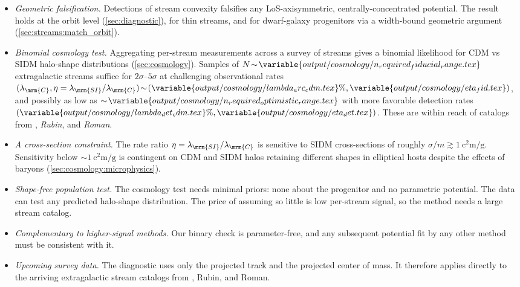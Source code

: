 \documentclass[linenumbers,twocolumn]{aastex701}
\newcommand{\lamC}{\ensuremath{\lambda_{\mrm{C}}}}    %
\newcommand{\lamSI}{\ensuremath{\lambda_{\mrm{SI}}}}  %
\newcommand{\lamCval}{\variable{output/cosmology/lambda_arc_cdm.tex}\%}
\begin{document}
    \begin{itemize}[leftmargin=5pt, labelsep=0.5em]
        \item \emph{Geometric falsification.} %
        Detections of stream convexity falsifies any \gls{LoS}-axisymmetric, centrally-concentrated potential. %
        The result holds at the orbit level (\autoref{sec:diagnostic}), for thin streams, and for dwarf-galaxy progenitors via a width-bound geometric argument (\autoref{sec:streams:match_orbit}).  %
        \item \emph{Binomial cosmology test.} %
        Aggregating per-stream measurements across a survey of streams gives a binomial likelihood for \gls{CDM} vs \gls{SIDM} halo-shape distributions (\autoref{sec:cosmology}). %
        Samples of $N\!\sim\!\variable{output/cosmology/n_required_fiducial_range.tex}$ extragalactic streams suffice for $2\sigma$--$5\sigma$ at challenging observational rates $(\lamC, \eta=\lamSI/\lamC)\!\sim\!(\lamCval,\variable{output/cosmology/eta_fid.tex})$, and possibly as low as $\sim\!\variable{output/cosmology/n_required_optimistic_range.tex}$ with more favorable detection rates $(\variable{output/cosmology/lambda_det_cdm.tex}\%, \variable{output/cosmology/eta_det.tex})$. These are within reach of catalogs from \euclid, \textit{Rubin}, and \textit{Roman}. %
        \item \emph{A cross-section constraint.} %
        The rate ratio $\eta=\lamSI/\lamC$ is sensitive to \gls{SIDM} cross-sections of roughly $\sigma/m\gtrsim\qty{1}{\square\centi\meter\per\gram}$. %
        Sensitivity below $\sim\qty{1}{\square\centi\meter\per\gram}$ is contingent on \gls{CDM} and \gls{SIDM} halos retaining different shapes in elliptical hosts despite the effects of baryons (\autoref{sec:cosmology:microphysics}). %
        \item \emph{Shape-free population test.} %
        The cosmology test needs minimal priors: none about the progenitor and no parametric potential. %
        The data can test any predicted halo-shape distribution. %
        The price of assuming so little is low per-stream signal, so the method needs a large stream catalog. %
        \item \emph{Complementary to higher-signal methods.} %
        Our binary check is parameter-free, and any subsequent potential fit by any other method must be consistent with it. %
        \item \emph{Upcoming survey data.} %
        The diagnostic uses only the projected track and the projected center of mass. %
        It therefore applies directly to the arriving extragalactic stream catalogs from \euclid, \gls{Rubin}, and \gls{Roman}. %
    \end{itemize}
\end{document}
